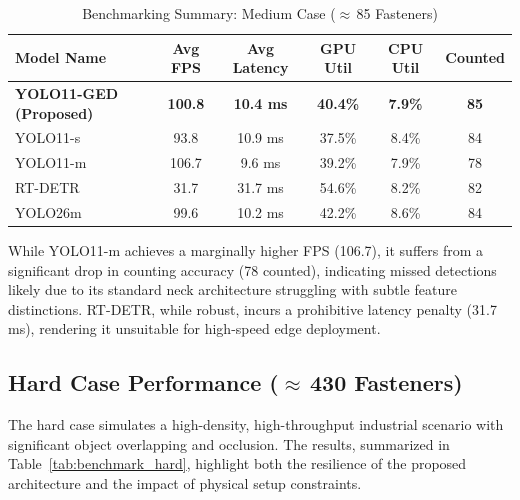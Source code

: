 \begin{table}[htbp]
    \centering
    \caption{Benchmarking Summary: Medium Case ($\approx$\,85 Fasteners)}
    \label{tab:benchmark_medium}
    \begin{tabular}{lccccc}
        \toprule
        \textbf{Model Name} & \textbf{Avg FPS} & \textbf{Avg Latency} & \textbf{GPU Util} & \textbf{CPU Util} & \textbf{Counted} \\
        \midrule
        \textbf{YOLO11-GED (Proposed)} & \textbf{100.8} & \textbf{10.4 ms} & \textbf{40.4\%} & \textbf{7.9\%} & \textbf{85} \\
        YOLO11-s             & 93.8           & 10.9 ms            & 37.5\%          & 8.4\%           & 84             \\
        YOLO11-m             & 106.7          & 9.6 ms             & 39.2\%          & 7.9\%           & 78             \\
        RT-DETR              & 31.7           & 31.7 ms            & 54.6\%          & 8.2\%           & 82             \\
        YOLO26m              & 99.6           & 10.2 ms            & 42.2\%          & 8.6\%           & 84             \\
        \bottomrule
    \end{tabular}
\end{table}

While YOLO11-m achieves a marginally higher FPS (106.7), it suffers from a significant drop in counting accuracy (78 counted), indicating missed detections likely due to its standard neck architecture struggling with subtle feature distinctions. RT-DETR, while robust, incurs a prohibitive latency penalty (31.7\,ms), rendering it unsuitable for high-speed edge deployment.

\subsection{Hard Case Performance ($\approx$\,430 Fasteners)}
The hard case simulates a high-density, high-throughput industrial scenario with significant object overlapping and occlusion. The results, summarized in Table~\ref{tab:benchmark_hard}, highlight both the resilience of the proposed architecture and the impact of physical setup constraints.

